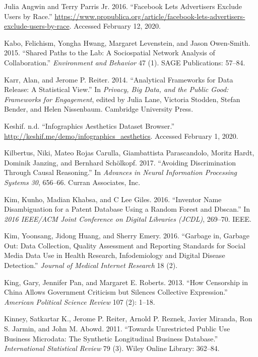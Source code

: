 \documentclass[]{krantz}
\begin{document}
\hypertarget{ref-angwin2016c}{}
Julia Angwin and Terry Parris Jr. 2016. ``Facebook Lets Advertisers
Exclude Users by Race.''
\url{https://www.propublica.org/article/facebook-lets-advertisers-exclude-users-by-race}.
Accessed February 12, 2020.

\hypertarget{ref-kabo2015shared}{}
Kabo, Felichism, Yongha Hwang, Margaret Levenstein, and Jason
Owen-Smith. 2015. ``Shared Paths to the Lab: A Sociospatial Network
Analysis of Collaboration.'' \emph{Environment and Behavior} 47 (1).
SAGE Publications: 57--84.

\hypertarget{ref-karr2014analytical}{}
Karr, Alan, and Jerome P. Reiter. 2014. ``Analytical Frameworks for Data
Release: A Statistical View.'' In \emph{Privacy, Big Data, and the
Public Good: Frameworks for Engagement}, edited by Julia Lane, Victoria
Stodden, Stefan Bender, and Helen Nissenbaum. Cambridge University
Press.

\hypertarget{ref-harrisonweb}{}
Keshif. n.d. ``Infographics Aesthetics Dataset Browser.''
\url{http://keshif.me/demo/infographics_aesthetics}. Accessed February
1, 2020.

\hypertarget{ref-kilbertus2017}{}
Kilbertus, Niki, Mateo Rojas Carulla, Giambattista Parascandolo, Moritz
Hardt, Dominik Janzing, and Bernhard Schölkopf. 2017. ``Avoiding
Discrimination Through Causal Reasoning.'' In \emph{Advances in Neural
Information Processing Systems 30}, 656--66. Curran Associates, Inc.

\hypertarget{ref-kim2016inventor}{}
Kim, Kunho, Madian Khabsa, and C Lee Giles. 2016. ``Inventor Name
Disambiguation for a Patent Database Using a Random Forest and Dbscan.''
In \emph{2016 IEEE/ACM Joint Conference on Digital Libraries (JCDL)},
269--70. IEEE.

\hypertarget{ref-Kim2016}{}
Kim, Yoonsang, Jidong Huang, and Sherry Emery. 2016. ``Garbage in,
Garbage Out: Data Collection, Quality Assessment and Reporting Standards
for Social Media Data Use in Health Research, Infodemiology and Digital
Disease Detection.'' \emph{Journal of Medical Internet Research} 18 (2).

\hypertarget{ref-King2013}{}
King, Gary, Jennifer Pan, and Margaret E. Roberts. 2013. ``How
Censorship in China Allows Government Criticism but Silences Collective
Expression.'' \emph{American Political Science Review} 107 (2): 1--18.

\hypertarget{ref-kinney2011towards}{}
Kinney, Satkartar K., Jerome P. Reiter, Arnold P. Reznek, Javier
Miranda, Ron S. Jarmin, and John M. Abowd. 2011. ``Towards Unrestricted
Public Use Business Microdata: The Synthetic Longitudinal Business
Database.'' \emph{International Statistical Review} 79 (3). Wiley Online
Library: 362--84.
\end{document}
